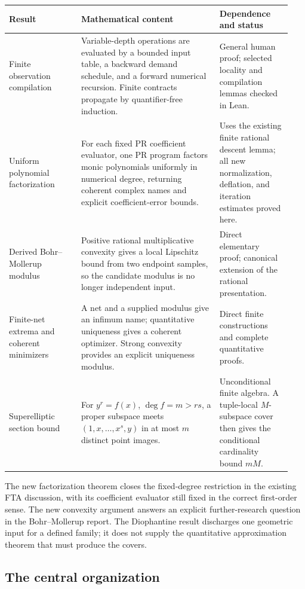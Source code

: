 \begin{longtable}{@{}>{\raggedright\arraybackslash}p{0.24\linewidth}>{\raggedright\arraybackslash}p{0.46\linewidth}>{\raggedright\arraybackslash}p{0.24\linewidth}@{}}
\toprule
Result & Mathematical content & Dependence and status\\
\midrule
\endhead
Finite observation compilation & Variable-depth operations are evaluated
by a bounded input table, a backward demand schedule, and a forward
numerical recursion. Finite contracts propagate by quantifier-free
induction. & General human proof; selected locality and compilation
lemmas checked in Lean.\\[5pt]
Uniform polynomial factorization & For each fixed PR coefficient evaluator,
one PR program factors monic polynomials uniformly in numerical degree,
returning coherent complex names and explicit coefficient-error bounds.
& Uses the existing finite rational descent lemma; all new normalization,
deflation, and iteration estimates proved here.\\[5pt]
Derived Bohr--Mollerup modulus & Positive rational multiplicative convexity
gives a local Lipschitz bound from two endpoint samples, so the candidate
modulus is no longer independent input. & Direct elementary proof;
canonical extension of the rational presentation.\\[5pt]
Finite-net extrema and coherent minimizers & A net and a supplied modulus
give an infimum name; quantitative uniqueness gives a coherent optimizer.
Strong convexity provides an explicit uniqueness modulus. & Direct
finite constructions and complete quantitative proofs.\\[5pt]
Superelliptic section bound & For $y^r=f(x)$, $\deg f=m>rs$, a proper
subspace meets $(1,x,\ldots,x^s,y)$ in at most $m$ distinct point images.
& Unconditional finite algebra. A tuple-local $M$-subspace cover then
gives the conditional cardinality bound $mM$.\\
\bottomrule
\end{longtable}

The new factorization theorem closes the fixed-degree restriction in the
existing FTA discussion, with its coefficient evaluator still fixed in the
correct first-order sense. The new convexity argument answers an explicit
further-research question in the Bohr--Mollerup report. The Diophantine
result discharges one geometric input for a defined family; it does not
supply the quantitative approximation theorem that must produce the
covers.

\subsection{The central organization}

